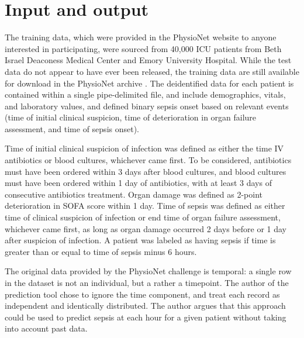 \documentclass[10pt,letterpaper]{article}
\begin{document}
\section*{Input and output}


\par The training data, which were provided in the PhysioNet website to anyone interested in participating, were sourced from 40,000 ICU patients from Beth Israel Deaconess Medical Center and Emory University Hospital. While the test data do not appear to have ever been released, the training data are still available for download in the PhysioNet archive \cite{Goldberger2000}. The deidentified data for each patient is contained within a single pipe-delimited file, and include demographics, vitals, and laboratory values, and defined binary sepsis onset based on relevant events (time of initial clinical suspicion, time of deterioration in organ failure assessment, and time of sepsis onset).

Time of initial clinical suspicion of infection was defined as either the time IV antibiotics or blood cultures, whichever came first. To be considered, antibiotics must have been ordered within 3 days after blood cultures, and blood cultures must have been ordered within 1 day of antibiotics, with at least 3 days of consecutive antibiotics treatment. Organ damage was defined as 2-point deterioration in SOFA score within 1 day. Time of sepsis was defined as either time of clinical suspicion of infection or end time of organ failure assessment, whichever came first, as long as organ damage occurred 2 days before or 1 day after suspicion of infection. A patient was labeled as having sepsis if time is greater than or equal to time of sepsis minus 6 hours.

The original data provided by the PhysioNet challenge is temporal: a single row in the dataset is not an individual, but a rather a timepoint. The author of the prediction tool chose to ignore the time component, and treat each record as independent and identically distributed. The author argues that this approach could be used to predict sepsis at each hour for a given patient without taking into account past data.
\end{document}
